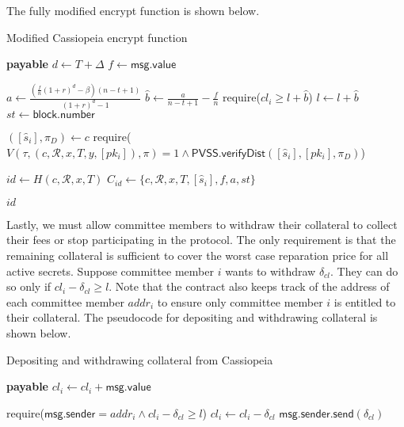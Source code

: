 The fully modified \textsf{encrypt} function is shown below.
\begin{algorithm}[H]
\caption{Modified Cassiopeia \textsf{encrypt} function}
\label{alg:encrypt_incentives}
    \begin{algorithmic}[1]
             \textbf{payable}
                \State $d \gets T + \Delta$
                \State $f \gets \textsf{msg.value}$

                \State $a \gets \frac{(\frac{f}{n}(1 + r)^d - \beta)(n - t + 1)}{(1 + r)^d - 1}$ 
                \State $\hat{b} \gets \frac{a}{n - t + 1} - \frac{f}{n}$ 
                    \State require($cl_i \geq l + \hat{b}$)
                \EndFor
                \State $l \gets l + \hat{b}$
                \State $st \gets \textsf{block.number}$

                \State $([\hat{s}_i], \pi_D) \gets c$
                \State require($V(\tau, (c, \mathcal{R}, x, T, y, [pk_i]), \pi) = 1 \land \textsf{PVSS.verifyDist}([\hat{s}_i], [pk_i], \pi_D)$)

                \State $id \gets H(c, \mathcal{R}, x, T)$
                \State $C_{id} \gets \{c, \mathcal{R}, x, T, [\hat{s}_i], f, a, st\}$

                \State \Return $id$
            \EndFunction
    \end{algorithmic}
\end{algorithm}

Lastly, we must allow committee members to withdraw their collateral to collect their fees or stop participating in the protocol.
The only requirement is that the remaining collateral is sufficient to cover the worst case reparation price for all active secrets.
Suppose committee member $i$ wants to withdraw $\delta_{cl}$.
They can do so only if $cl_i - \delta_{cl} \geq l$.
Note that the contract also keeps track of the address of each committee member $addr_i$ to ensure only committee member $i$ is entitled to their collateral.
The pseudocode for depositing and withdrawing collateral is shown below.

\begin{algorithm}[H]
\caption{Depositing and withdrawing collateral from Cassiopeia}
    \begin{algorithmic}[1]
         \textbf{payable}
            \State $cl_i \gets cl_i + \textsf{msg.value}$
        \EndFunction

            \State require($\textsf{msg.sender} = addr_i \land cl_i - \delta_{cl} \geq l$)
            \State $cl_i \gets cl_i - \delta_{cl}$
            \State $\textsf{msg.sender.send}(\delta_{cl})$
        \EndFunction
    \end{algorithmic}
\end{algorithm}

